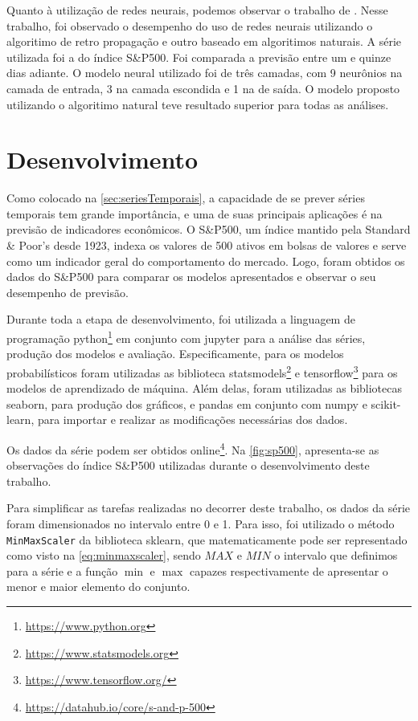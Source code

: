 \documentclass[
    12pt,
    oneside,
    a4paper,
    english,
    brazil
]{abntex2}
\begin{document}
Quanto  à  utilização  de  redes   neurais,  podemos  observar  o  trabalho  de
. Nesse  trabalho, foi  observado o  desempenho do  uso de
redes neurais  utilizando o algoritimo de  retro propagação e outro  baseado em
algoritimos naturais. A série utilizada foi  a do índice S\&P500. Foi comparada
a previsão  entre um e  quinze dias adiante. O  modelo neural utilizado  foi de
três camadas, com 9  neurônios na camada de entrada, 3 na  camada escondida e 1
na de saída.  O modelo proposto utilizando o algoritimo  natural teve resultado
superior para todas as análises.

\chapter{Desenvolvimento}\label{chap:desenv}

Como  colocado  na \autoref{sec:seriesTemporais},  a  capacidade  de se  prever
séries temporais tem grande importância, e  uma de suas principais aplicações é
na  previsão de  indicadores  econômicos.  O S\&P500,  um  índice mantido  pela
Standard \&  Poor's desde 1923,  indexa os valores de  500 ativos em  bolsas de
valores e  serve como  um indicador  geral do  comportamento do  mercado. Logo,
foram  obtidos os  dados do  S\&P500 para  comparar os  modelos apresentados  e
observar o seu desempenho de previsão.

Durante  toda  a  etapa  de  desenvolvimento,  foi  utilizada  a  linguagem  de
programação   python\footnote{\url{https://www.python.org}}  em   conjunto  com
jupyter  para  a  análise  das   séries,  produção  dos  modelos  e  avaliação.
Especificamente,   para    os   modelos   probabilísticos    foram   utilizadas
as    biblioteca   statsmodels\footnote{\url{https://www.statsmodels.org}}    e
tensorflow\footnote{\url{https://www.tensorflow.org/}}   para  os   modelos  de
aprendizado de  máquina. Além delas,  foram utilizadas as  bibliotecas seaborn,
para produção dos gráficos, e pandas em conjunto com numpy e scikit-learn, para
importar e realizar as modificações necessárias dos dados.

Os           dados            da           série            podem           ser
obtidos      online\footnote{\url{https://datahub.io/core/s-and-p-500}}.     Na
\autoref{fig:sp500}, apresenta-se  as observações do índice  S\&P500 utilizadas
durante o desenvolvimento deste trabalho.

Para simplificar as tarefas realizadas no  decorrer deste trabalho, os dados da
série foram dimensionados no intervalo entre 0  e 1. Para isso, foi utilizado o
método \texttt{MinMaxScaler}  da biblioteca  sklearn, que  matematicamente pode
ser representado como visto na \autoref{eq:minmaxscaler}, sendo $MAX$ e $MIN$ o
intervalo  que definimos  para  a série  e  a função  $\min$  e $\max$  capazes
respectivamente de apresentar o menor e maior elemento do conjunto.
\end{document}
